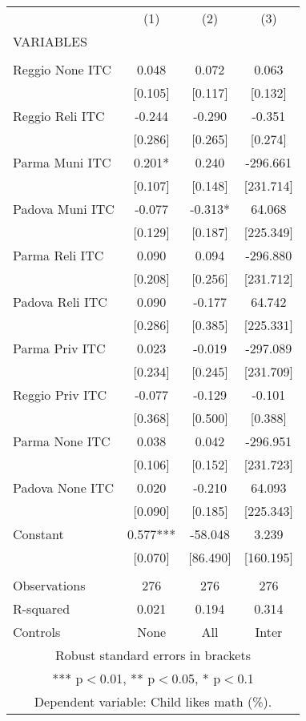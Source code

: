 \begin{tabular}{lccc} \hline
 & (1) & (2) & (3) \\
VARIABLES &  &  &  \\ \hline
 &  &  &  \\
Reggio None ITC & 0.048 & 0.072 & 0.063 \\
 & [0.105] & [0.117] & [0.132] \\
Reggio Reli ITC & -0.244 & -0.290 & -0.351 \\
 & [0.286] & [0.265] & [0.274] \\
Parma Muni ITC & 0.201* & 0.240 & -296.661 \\
 & [0.107] & [0.148] & [231.714] \\
Padova Muni ITC & -0.077 & -0.313* & 64.068 \\
 & [0.129] & [0.187] & [225.349] \\
Parma Reli ITC & 0.090 & 0.094 & -296.880 \\
 & [0.208] & [0.256] & [231.712] \\
Padova Reli ITC & 0.090 & -0.177 & 64.742 \\
 & [0.286] & [0.385] & [225.331] \\
Parma Priv ITC & 0.023 & -0.019 & -297.089 \\
 & [0.234] & [0.245] & [231.709] \\
Reggio Priv ITC & -0.077 & -0.129 & -0.101 \\
 & [0.368] & [0.500] & [0.388] \\
Parma None ITC & 0.038 & 0.042 & -296.951 \\
 & [0.106] & [0.152] & [231.723] \\
Padova None ITC & 0.020 & -0.210 & 64.093 \\
 & [0.090] & [0.185] & [225.343] \\
Constant & 0.577*** & -58.048 & 3.239 \\
 & [0.070] & [86.490] & [160.195] \\
 &  &  &  \\
Observations & 276 & 276 & 276 \\
R-squared & 0.021 & 0.194 & 0.314 \\
 Controls & None & All & Inter \\ \hline
\multicolumn{4}{c}{ Robust standard errors in brackets} \\
\multicolumn{4}{c}{ *** p$<$0.01, ** p$<$0.05, * p$<$0.1} \\
\multicolumn{4}{c}{ Dependent variable: Child likes math (\%).} \\
\end{tabular}
